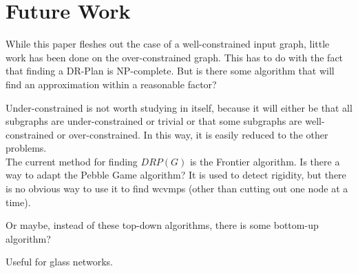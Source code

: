 \documentclass[11pt]{article}
\begin{document}

\section{Future Work}
While this paper fleshes out the case of a well-constrained input graph, little work has been done on the over-constrained graph. This has to do with the fact that finding a DR-Plan is NP-complete. But is there some algorithm that will find an approximation within a reasonable factor?

Under-constrained is not worth studying in itself, because it will either be that all subgraphs are under-constrained or trivial or that some subgraphs are well-constrained or over-constrained. In this way, it is easily reduced to the other problems.
\\

The current method for finding $DRP(G)$ is the Frontier algorithm. Is there a way to adapt the Pebble Game algorithm? It is used to detect rigidity, but there is no obvious way to use it to find wcvmps (other than cutting out one node at a time).

Or maybe, instead of these top-down algorithms, there is some bottom-up algorithm?

Useful for glass networks.
\end{document}
